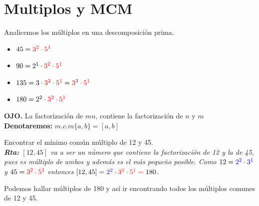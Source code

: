 \section{Multiplos y MCM}\label{section_multiplos_MCM}
Analicemos los múltiplos en una descomposición prima. 
\begin{center}
\begin{itemize}
	\item $45=\color{red} 3^2\cdot 5^1$
	\item $90=2^1\cdot \color{red} 3^2\cdot 5^1$
	\item $135=3\cdot \color{red} 3^2\cdot 5^1 \color{black}= \color{red} 3^{\color{black}3 }\cdot\color{red} 5^1$
	\item $180=2^2\cdot \color{red} 3^2\cdot 5^1$
\end{itemize}
\end{center}

\textbf{OJO. }La factorización de $mn$, contiene la factorización de $n$ y $m$\\
\textbf{Denotaremos: }$m.c.m\{a,b\}=[a,b]$\\

\begin{ejemplo}
	Encontrar el mínimo común múltiplo de 12 y 45. \\
	\textit{\textbf{Rta:} $[12,45]$ va a ser un número que contiene la factorización de 12 y la de 45, pues es múltiplo de ambos y además es el más pequeño posible. Como $12=\color{blue}2^2\cdot 3^1$ y $45=\color{red}3^2\cdot 5^1$ entonces $[12,45]=\color{blue}2^2\cdot\color{red}3^2\cdot 5^1=\color{black}180$}.
	
	Podemos hallar múltiplos de 180 y así ir encontrando todos los múltiplos comunes de 12 y 45.
\end{ejemplo}

